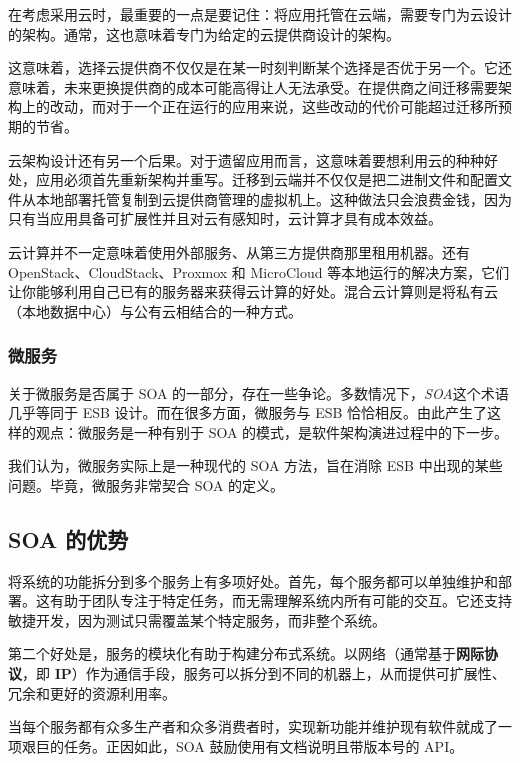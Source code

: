 在考虑采用云时，最重要的一点是要记住：将应用托管在云端，需要专门为云设计的架构。通常，这也意味着专门为给定的云提供商设计的架构。

这意味着，选择云提供商不仅仅是在某一时刻判断某个选择是否优于另一个。它还意味着，未来更换提供商的成本可能高得让人无法承受。在提供商之间迁移需要架构上的改动，而对于一个正在运行的应用来说，这些改动的代价可能超过迁移所预期的节省。

云架构设计还有另一个后果。对于遗留应用而言，这意味着要想利用云的种种好处，应用必须首先重新架构并重写。迁移到云端并不仅仅是把二进制文件和配置文件从本地部署托管复制到云提供商管理的虚拟机上。这种做法只会浪费金钱，因为只有当应用具备可扩展性并且对云有感知时，云计算才具有成本效益。

\label{idx:1375}
\label{idx:1376}
云计算并不一定意味着使用外部服务、从第三方提供商那里租用机器。还有 OpenStack、CloudStack、Proxmox 和 MicroCloud 等本地运行的解决方案，它们让你能够利用自己已有的服务器来获得云计算的好处。混合云计算则是将私有云（本地数据中心）与公有云相结合的一种方式。

\subsubsection{微服务}

\label{idx:1377}
\label{idx:1378}
关于微服务是否属于 SOA 的一部分，存在一些争论。多数情况下，\emph{SOA}这个术语几乎等同于 ESB 设计。而在很多方面，微服务与 ESB 恰恰相反。由此产生了这样的观点：微服务是一种有别于 SOA 的模式，是软件架构演进过程中的下一步。

我们认为，微服务实际上是一种现代的 SOA 方法，旨在消除 ESB 中出现的某些问题。毕竟，微服务非常契合 SOA 的定义。

\subsection{SOA 的优势}

\label{idx:1379}
将系统的功能拆分到多个服务上有多项好处。首先，每个服务都可以单独维护和部署。这有助于团队专注于特定任务，而无需理解系统内所有可能的交互。它还支持敏捷开发，因为测试只需覆盖某个特定服务，而非整个系统。

\label{idx:1380}
第二个好处是，服务的模块化有助于构建分布式系统。以网络（通常基于\textbf{网际协议}，即 \textbf{IP}）作为通信手段，服务可以拆分到不同的机器上，从而提供可扩展性、冗余和更好的资源利用率。

当每个服务都有众多生产者和众多消费者时，实现新功能并维护现有软件就成了一项艰巨的任务。正因如此，SOA 鼓励使用有文档说明且带版本号的 API。


